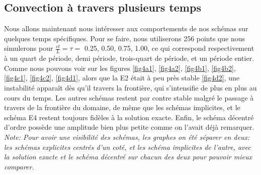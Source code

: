 \documentclass{article}
\begin{document}
\subsection{Convection à travers plusieurs temps}
Nous allons maintenant nous intéresser aux comportements de nos schémas sur quelques temps spécifiques. Pour se faire, nous utiliserons 256 points que nous simulerons pour $\frac{ct}{L} = \tau = $ 0.25, 0.50, 0.75, 1.00, ce qui correspond respectivement à un quart de période, demi période, trois-quart de période, et un période entier. Comme nous pouvons voir sur les figures  \ref{fig4a1}, \ref{fig4a2}, \ref{fig4b1}, \ref{fig4b2}, \ref{fig4c1}, \ref{fig4c2}, \ref{fig4d1}, alors que la E2 était à peu près stable \ref{fig4d2}, une instabilité apparaît dès qu'il travers la frontière, qui s'intensifie de plus en plus au cours du temps. Les autres schémas restent par contre stable malgré le passage à travers de la frontière du domaine, de même que les schémas implicites, et le schéma E4 restent toujours fidèles à la solution exacte. Enfin, le schéma décentré d'ordre possède une amplitude bien plus petite comme on l'avait déjà remarquer. \\

\textit{Note: Pour avoir une visibilité des schémas, les graphes on été séparer en deux: les schémas explicites centrés d'un coté, et les schéma implicites de l'autre, avec la solution exacte et le schéma décentré sur chacun des deux pour pouvoir mieux comparer.}
\end{document}
